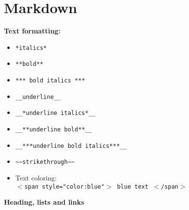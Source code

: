 
\section{Markdown}
\textbf{Text formatting:}\\
\begin{itemize}
\item \texttt{*italics*} \\
\item \texttt{**bold**} \\
\item \texttt{*** bold italics ***}\\
\item \texttt{\_\_underline\_\_}\\
\item \texttt{\_\_*underline italics*\_\_}\\
\item \texttt{\_\_**underline bold**\_\_}
\item \texttt{\_\_***underline bold italics***\_\_}
\item \texttt{\~{}\~{}strikethrough\~{}\~{}}
\item Text coloring:\\
\texttt{$<$span style="color:blue"$>$ blue text $<$/span$>$}

\end{itemize}

\textbf{Heading, lists and links}\\

